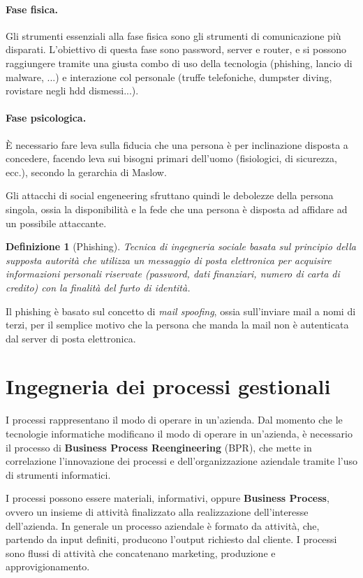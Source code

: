 \documentclass[a4paper, 10pt]{article}
\newtheorem{definit}{Definizione}[subsection]
\begin{document}
	\paragraph{Fase fisica.} Gli strumenti essenziali alla fase fisica sono gli strumenti di comunicazione più disparati. L'obiettivo di questa fase sono password, server e router, e si possono raggiungere tramite una giusta combo di uso della tecnologia (phishing, lancio di malware, ...) e interazione col personale (truffe telefoniche, dumpster diving, rovistare negli hdd dismessi...).
	
	\paragraph{Fase psicologica.} È necessario fare leva sulla fiducia che una persona è per inclinazione disposta a concedere, facendo leva sui bisogni primari dell'uomo (fisiologici, di sicurezza, ecc.), secondo la gerarchia di Maslow. 
	
	Gli attacchi di social engeneering sfruttano quindi le debolezze della persona singola, ossia la disponibilità e la fede che una persona è disposta ad affidare ad un possibile attaccante.
	
	 \begin{definit}[Phishing]
		Tecnica di ingegneria sociale basata sul principio della supposta autorità che utilizza un messaggio di posta elettronica per acquisire informazioni personali riservate (password, dati finanziari, numero di carta di credito) con la finalità del furto di identità.
	\end{definit}

	Il phishing è basato sul concetto di \textit{mail spoofing}, ossia sull'inviare mail a nomi di terzi, per il semplice motivo che la persona che manda la mail non è autenticata dal server di posta elettronica.
	
	\section{Ingegneria dei processi gestionali}
	
	I processi rappresentano il modo di operare in un'azienda. Dal momento che le tecnologie informatiche modificano il modo di operare in un'azienda, è necessario il processo di \textbf{Business Process Reengineering} (BPR), che mette in correlazione l'innovazione dei processi e dell'organizzazione aziendale tramite l'uso di strumenti informatici.
	
	I processi possono essere materiali, informativi, oppure \textbf{Business Process}, ovvero un insieme di attività finalizzato alla realizzazione dell'interesse dell'azienda. In generale un processo aziendale è formato da attività, che, partendo da input definiti, producono l'output richiesto dal cliente.  I processi sono flussi di attività che concatenano marketing, produzione e approvigionamento. 
	
\end{document}
